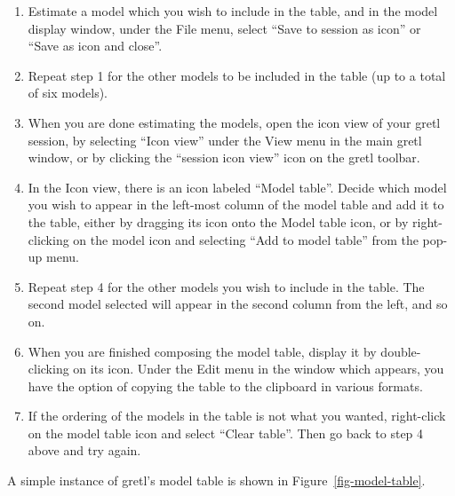       
\begin{enumerate}
\item Estimate a model which you wish to include in the table, and in
  the model display window, under the File menu, select ``Save to
  session as icon'' or ``Save as icon and close''.
\item Repeat step 1 for the other models to be included in the table
  (up to a total of six models).
\item When you are done estimating the models, open the icon view of
  your gretl session, by selecting ``Icon view'' under the View
  menu in the main gretl window, or by clicking the ``session icon
  view'' icon on the gretl toolbar.
\item In the Icon view, there is an icon labeled ``Model table''.
  Decide which model you wish to appear in the left-most column of the
  model table and add it to the table, either by dragging its icon
  onto the Model table icon, or by right-clicking on the model icon
  and selecting ``Add to model table'' from the pop-up menu.
\item Repeat step 4 for the other models you wish to include in the
  table.  The second model selected will appear in the second column
  from the left, and so on.
\item When you are finished composing the model table, display it by
  double-clicking on its icon.  Under the Edit menu in the window
  which appears, you have the option of copying the table to the
  clipboard in various formats.
\item If the ordering of the models in the table is not what you
  wanted, right-click on the model table icon and select ``Clear
  table''.  Then go back to step 4 above and try again.
\end{enumerate}

A simple instance of gretl's model table is shown in
Figure~\ref{fig-model-table}.

